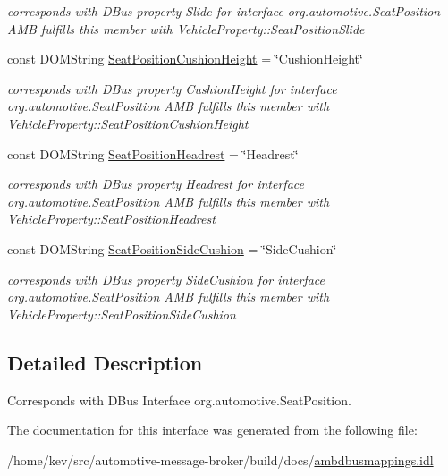 \begin{DoxyCompactItemize}
\begin{DoxyCompactList}\small\item\em corresponds with D\+Bus property Slide for interface org.\+automotive.\+Seat\+Position A\+M\+B fulfills this member with Vehicle\+Property\+::\+Seat\+Position\+Slide \end{DoxyCompactList}\item 
\hypertarget{interfaceSeatPosition_a71c2aafbae2d66d1a0bbb148c819ca2b}{const D\+O\+M\+String \hyperlink{interfaceSeatPosition_a71c2aafbae2d66d1a0bbb148c819ca2b}{Seat\+Position\+Cushion\+Height} = \char`\"{}Cushion\+Height\char`\"{}}\label{interfaceSeatPosition_a71c2aafbae2d66d1a0bbb148c819ca2b}

\begin{DoxyCompactList}\small\item\em corresponds with D\+Bus property Cushion\+Height for interface org.\+automotive.\+Seat\+Position A\+M\+B fulfills this member with Vehicle\+Property\+::\+Seat\+Position\+Cushion\+Height \end{DoxyCompactList}\item 
\hypertarget{interfaceSeatPosition_ac8c68e0e481bb1e1d9dfc89256bccfd5}{const D\+O\+M\+String \hyperlink{interfaceSeatPosition_ac8c68e0e481bb1e1d9dfc89256bccfd5}{Seat\+Position\+Headrest} = \char`\"{}Headrest\char`\"{}}\label{interfaceSeatPosition_ac8c68e0e481bb1e1d9dfc89256bccfd5}

\begin{DoxyCompactList}\small\item\em corresponds with D\+Bus property Headrest for interface org.\+automotive.\+Seat\+Position A\+M\+B fulfills this member with Vehicle\+Property\+::\+Seat\+Position\+Headrest \end{DoxyCompactList}\item 
\hypertarget{interfaceSeatPosition_a8d99f1b16ca607b77e32f77a3f0c643e}{const D\+O\+M\+String \hyperlink{interfaceSeatPosition_a8d99f1b16ca607b77e32f77a3f0c643e}{Seat\+Position\+Side\+Cushion} = \char`\"{}Side\+Cushion\char`\"{}}\label{interfaceSeatPosition_a8d99f1b16ca607b77e32f77a3f0c643e}

\begin{DoxyCompactList}\small\item\em corresponds with D\+Bus property Side\+Cushion for interface org.\+automotive.\+Seat\+Position A\+M\+B fulfills this member with Vehicle\+Property\+::\+Seat\+Position\+Side\+Cushion \end{DoxyCompactList}\end{DoxyCompactItemize}


\subsection{Detailed Description}
Corresponds with D\+Bus Interface org.\+automotive.\+Seat\+Position. 

The documentation for this interface was generated from the following file\+:\begin{DoxyCompactItemize}
\item 
/home/kev/src/automotive-\/message-\/broker/build/docs/\hyperlink{ambdbusmappings_8idl}{ambdbusmappings.\+idl}\end{DoxyCompactItemize}
